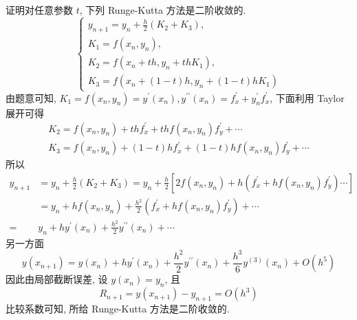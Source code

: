  \begin{tcolorbox}[enhanced,colback=8,colframe=7,breakable,coltitle=green!25!black,title=2024]
证明对任意参数 $ t $, 下列 Runge-Kutta 方法是二阶收敛的.
$$
\left\{\begin{array}{l}
y_{n+1}=y_{n}+\frac{h}{2}\left(K_{2}+K_{3}\right), \\
K_{1}=f\left(x_{n}, y_{n}\right), \\
K_{2}=f\left(x_{n}+t h, y_{n}+t h K_{1}\right), \\
K_{3}=f\left(x_{n}+(1-t) h, y_{n}+(1-t) h K_{1}\right)
\end{array}\right.
$$
 \tcblower
 由题意可知, $ K_{1}=f\left(x_{n}, y_{n}\right)=y^{\prime}\left(x_{n}\right), y^{\prime \prime}\left(x_{n}\right)=f_{x}^{\prime}+y_{n}^{\prime} f_{x}^{\prime} $, 下面利用 Taylor 展开可得
$$
\begin{array}{c}
K_{2}=f\left(x_{n}, y_{n}\right)+t h f_{x}^{\prime}+t h f\left(x_{n}, y_{n}\right) f_{y}^{\prime}+\cdots \\
K_{3}=f\left(x_{n}, y_{n}\right)+(1-t) h f_{x}^{\prime}+(1-t) h f\left(x_{n}, y_{n}\right) f_{y}^{\prime}+\cdots
\end{array}
$$
所以
$$
\begin{aligned}
y_{n+1} & =y_{n}+\frac{h}{2}\left(K_{2}+K_{3}\right)=y_{n}+\frac{h}{2}\left[2 f\left(x_{n}, y_{n}\right)+h\left(f_{x}^{\prime}+h f\left(x_{n}, y_{n}\right) f_{y}^{\prime}\right) \cdots\right] \\
& =y_{n}+h f\left(x_{n}, y_{n}\right)+\frac{h^{2}}{2}\left(f_{x}^{\prime}+h f\left(x_{n}, y_{n}\right) f_{y}^{\prime}\right)+\cdots\\
=&y_{n}+h y^{\prime}\left(x_{n}\right)+\frac{h^{2}}{2} y^{\prime \prime}\left(x_{n}\right)+\cdots
\end{aligned}
$$
另一方面
$$
y\left(x_{n+1}\right)=y\left(x_{n}\right)+h y^{\prime}\left(x_{n}\right)+\frac{h^{2}}{2} y^{\prime \prime}\left(x_{n}\right)+\frac{h^{3}}{6} y^{(3)}\left(x_{n}\right)+O\left(h^{5}\right)
$$
因此由局部截断误差, 设 $ y\left(x_{n}\right)=y_{n} $, 且
$$
R_{n+1}=y\left(x_{n+1}\right)-y_{n+1}=O\left(h^{3}\right)
$$
比较系数可知, 所给 Runge-Kutta 方法是二阶收敛的.
 \end{tcolorbox}



